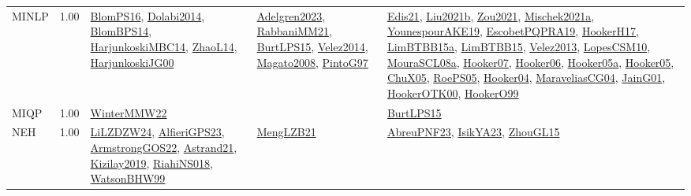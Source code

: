 {\begin{longtable}{p{3cm}r>{\raggedright\arraybackslash}p{6cm}>{\raggedright\arraybackslash}p{6cm}>{\raggedright\arraybackslash}p{8cm}}
\index{MINLP}\index{Algorithms!MINLP}MINLP &  1.00 & \hyperref[detail:BlomPS16]{BlomPS16}, \hyperref[detail:Dolabi2014]{Dolabi2014}, \hyperref[detail:BlomBPS14]{BlomBPS14}, \hyperref[detail:HarjunkoskiMBC14]{HarjunkoskiMBC14}, \hyperref[detail:ZhaoL14]{ZhaoL14}, \hyperref[detail:HarjunkoskiJG00]{HarjunkoskiJG00} & \hyperref[detail:Adelgren2023]{Adelgren2023}, \hyperref[detail:RabbaniMM21]{RabbaniMM21}, \hyperref[detail:BurtLPS15]{BurtLPS15}, \hyperref[detail:Velez2014]{Velez2014}, \hyperref[detail:Magato2008]{Magato2008}, \hyperref[detail:PintoG97]{PintoG97} & \hyperref[detail:Edis21]{Edis21}, \hyperref[detail:Liu2021b]{Liu2021b}, \hyperref[detail:Zou2021]{Zou2021}, \hyperref[detail:Mischek2021a]{Mischek2021a}, \hyperref[detail:YounespourAKE19]{YounespourAKE19}, \hyperref[detail:EscobetPQPRA19]{EscobetPQPRA19}, \hyperref[detail:HookerH17]{HookerH17}, \hyperref[detail:LimBTBB15a]{LimBTBB15a}, \hyperref[detail:LimBTBB15]{LimBTBB15}, \hyperref[detail:Velez2013]{Velez2013}, \hyperref[detail:LopesCSM10]{LopesCSM10}, \hyperref[detail:MouraSCL08a]{MouraSCL08a}, \hyperref[detail:Hooker07]{Hooker07}, \hyperref[detail:Hooker06]{Hooker06}, \hyperref[detail:Hooker05a]{Hooker05a}, \hyperref[detail:Hooker05]{Hooker05}, \hyperref[detail:ChuX05]{ChuX05}, \hyperref[detail:RoePS05]{RoePS05}, \hyperref[detail:Hooker04]{Hooker04}, \hyperref[detail:MaraveliasCG04]{MaraveliasCG04}, \hyperref[detail:JainG01]{JainG01}, \hyperref[detail:HookerOTK00]{HookerOTK00}, \hyperref[detail:HookerO99]{HookerO99}\\
\index{MIQP}\index{Algorithms!MIQP}MIQP &  1.00 & \hyperref[detail:WinterMMW22]{WinterMMW22} &  & \hyperref[detail:BurtLPS15]{BurtLPS15}\\
\index{NEH}\index{Algorithms!NEH}NEH &  1.00 & \hyperref[detail:LiLZDZW24]{LiLZDZW24}, \hyperref[detail:AlfieriGPS23]{AlfieriGPS23}, \hyperref[detail:ArmstrongGOS22]{ArmstrongGOS22}, \hyperref[detail:Astrand21]{Astrand21}, \hyperref[detail:Kizilay2019]{Kizilay2019}, \hyperref[detail:RiahiNS018]{RiahiNS018}, \hyperref[detail:WatsonBHW99]{WatsonBHW99} & \hyperref[detail:MengLZB21]{MengLZB21} & \hyperref[detail:AbreuPNF23]{AbreuPNF23}, \hyperref[detail:IsikYA23]{IsikYA23}, \hyperref[detail:ZhouGL15]{ZhouGL15}\\

\end{longtable}}
